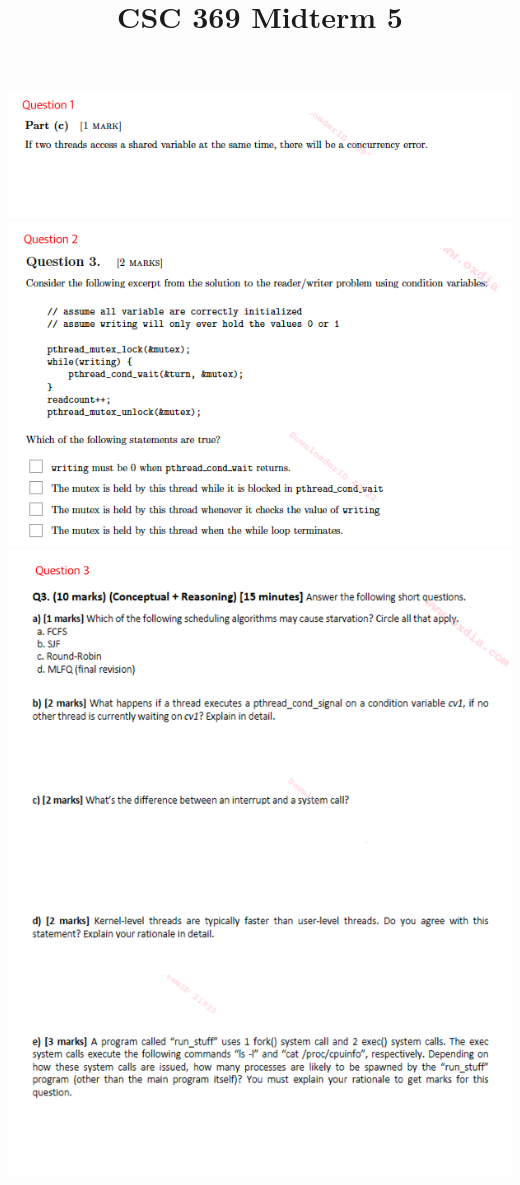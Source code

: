 \documentclass[12pt]{article}
\begin{document}
\title{CSC 369 Midterm 5}

\bigskip

\begin{center}
    \includegraphics[width=\linewidth]{../../images/midterm_5_1.png}
    \includegraphics[width=\linewidth]{../../images/midterm_5_2.png}
    \includegraphics[width=\linewidth]{../../images/midterm_5_3.png}

\end{center}
\end{document}
